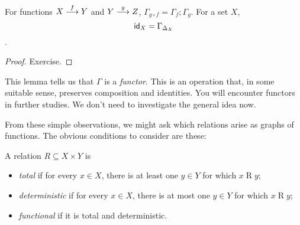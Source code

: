 \begin{lemma}
	For functions $\sfromto fXY$ and $\sfromto gYZ$, $\Gamma_{g\circ f} = \Gamma_f;\Gamma_g$.
	For a set $X$, \[\id_X = \Gamma_{\Delta_X}\]. 
	
	\begin{proof}
		Exercise.
	\end{proof}
\end{lemma}

This lemma tells us that $\Gamma$ is a \emph{functor}. This is an operation that, in some suitable sense, preserves composition and identities. You will encounter functors in further studies. We don't need to investigate the general idea now.

From these simple observations, we might ask which relations arise as graphs of functions. The obvious conditions to consider are these:

\begin{defn}
A relation $R\subseteq {X\times Y}$ is
\begin{itemize}
	\item \emph{total} if for every $x\in X$, there is at least one $y\in Y$ for which $x\mathrel{R}y$;
	\item \emph{deterministic} if for every $x\in X$, there is at most one $y\in Y$ for which $x\mathrel{R}y$;
	\item \emph{functional} if it is total and deterministic.
\end{itemize}
\end{defn}

